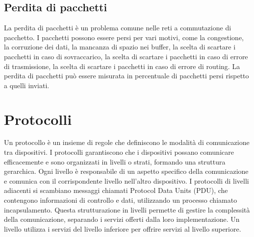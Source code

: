 \documentclass[12pt]{report}
\begin{document}
	\subsection{Perdita di pacchetti}
	La perdita di pacchetti è un problema comune nelle reti a commutazione di pacchetto. I pacchetti possono essere persi per vari motivi, come la congestione, la corruzione dei dati, la mancanza di spazio nei buffer, la scelta di scartare i pacchetti in caso di sovraccarico, la scelta di scartare i pacchetti in caso di errore di trasmissione, la scelta di scartare i pacchetti in caso di errore di routing. La perdita di pacchetti può essere misurata in percentuale di pacchetti persi rispetto a quelli inviati.

	\section{Protocolli}
	Un protocollo è un insieme di regole che definiscono le modalità di comunicazione tra dispositivi. I protocolli garantiscono che i dispositivi possano comunicare efficacemente e sono organizzati in livelli o strati, formando una struttura gerarchica. Ogni livello è responsabile di un aspetto specifico della comunicazione e comunica con il corrispondente livello nell'altro dispositivo. I protocolli di livelli adiacenti si scambiano messaggi chiamati Protocol Data Units (PDU), che contengono informazioni di controllo e dati, utilizzando un processo chiamato incapsulamento. Questa strutturazione in livelli permette di gestire la complessità della comunicazione, separando i servizi offerti dalla loro implementazione. Un livello utilizza i servizi del livello inferiore per offrire servizi al livello superiore.
\end{document}
